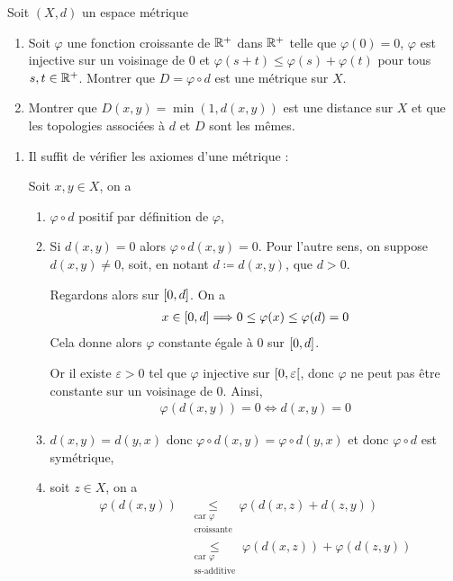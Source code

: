 \documentclass[french,a4paper,10pt]{article}
\begin{document}
	\medspace
	\begin{td-exo}
		Soit $(X, d)$ un espace métrique
			\begin{enumerate}
				\item Soit $\varphi$ une fonction croissante de $\mathbb{R}^+$ dans $\mathbb{R}^+$ telle que $\varphi(0)=0$, $\varphi$ est injective sur un voisinage de $0$ et $\varphi(s+t)\le\varphi(s)+\varphi(t)$ pour tous $s,t\in \mathbb{R}^+$. Montrer que $D=\varphi\circ d$ est une métrique sur $X$.
				
				\item Montrer que $D(x,y)=\min(1,d(x,y))$ est une distance sur $X$ et que les topologies associées à $d$ et $D$ sont les mêmes.
			\end{enumerate}
	\end{td-exo}
	\begin{td-sol}
		\begin{enumerate}
			\item 
				
				Il suffit de vérifier les axiomes d'une métrique :
				
				Soit $x,y\in X$, on a
				\begin{enumerate}[label=$(\roman*)$]
					\item $\varphi\circ d$ positif par définition de $\varphi$,
					
					\item Si $d(x,y)=0$ alors $\varphi\circ d(x,y)=0$. Pour l'autre sens, on suppose $d(x,y)\ne 0$, soit, en notant $d\coloneq d(x,y)$, que $d>0$.
					
					Regardons alors sur $\mathopen{[}0,d\mathclose{]}$. On a
					\[\begin{aligned}
						x\in\mathopen{[}0,d\mathclose{]}\Longrightarrow 0\le\varphi(x)\le\varphi(d)=0
					\end{aligned}\]
					Cela donne alors $\varphi$ constante égale à 0 sur $\mathopen{[}0,d\mathclose{]}$.
					
					Or il existe $\varepsilon>0$ tel que $\varphi$ injective sur $\mathopen{[}0,\varepsilon\mathclose{[}$, donc $\varphi$ ne peut pas être constante sur un voisinage de $0$. Ainsi,
					\[\begin{aligned}
						\varphi(d(x,y))=0\Longleftrightarrow d(x,y)=0
					\end{aligned}\]
					
					\item $d(x,y)=d(y,x)$ donc $\varphi\circ d(x,y)=\varphi\circ d(y,x)$ et donc $\varphi\circ d$ est symétrique,
					
					\item soit $z\in X$, on a
					\[\begin{aligned}
						\varphi(d(x,y))&\underset{\substack{\text{car }\varphi\\\text{croissante}}}{\le} \varphi(d(x,z)+d(z,y))\\
						&\underset{\substack{\text{car }\varphi\\\text{ss-additive}}}{\le} \varphi(d(x,z))+\varphi(d(z,y))
					\end{aligned}\]
				\end{enumerate}
			

\end{enumerate}
\end{td-sol}
\end{document}
